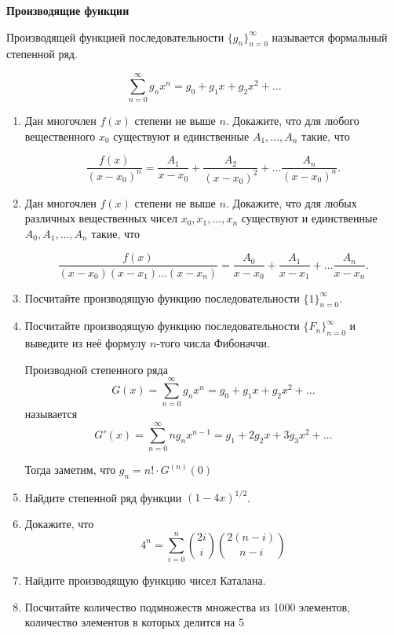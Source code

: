 \documentclass{article}
\begin{document}
\large
	

\begin{center}
\textbf{Производящие функции}
\end{center}


Производящей функцией последовательности $\{g_n\}_{n = 0}^{\infty}$ называется формальный степенной ряд.

$$\sum_{n = 0}^{\infty}g_nx^n = g_0 + g_1x + g_2x^2 + \dotsc$$
\begin{enumerate}[label*=\protect\fbox{\arabic{enumi}}]

\item Дан многочлен $f(x)$ степени не выше $n$. Докажите, что для любого вещественного $x_0$ существуют и единственные $A_1, \dotsc , A_n$ такие, что

$$\frac{f(x)}{(x - x_0)^n} = \frac{A_1}{x-x_0} + \frac{A_2}{(x-x_0)^2} + \dotsc \frac{A_n}{(x-x_0)^n}.$$

\item Дан многочлен $f(x)$ степени не выше $n$. Докажите, что для любых различных вещественных чисел $x_0, x_1, . . . , x_n$ существуют и единственные $A_0, A_1, \dotsc , A_n$ такие, что

$$\frac{f(x)}{(x - x_0)(x-x_1)\dotsc(x-x_n)} = \frac{A_0}{x-x_0} + \frac{A_1}{x-x_1} + \dotsc \frac{A_n}{x-x_n}.$$

\item Посчитайте производящую функцию последовательности $\{1\}_{n = 0}^{\infty}$.

\item Посчитайте производящую функцию последовательности $\{F_n\}_{n = 0}^{\infty}$ и выведите из неё формулу $n$-того числа Фибоначчи.

Производной степенного ряда
$$G(x) = \sum_{n = 0}^{\infty}g_nx^n = g_0 + g_1x + g_2x^2 + \dotsc$$
называется
$$G'(x) = \sum_{n = 0}^{\infty}ng_nx^{n-1} = g_1 + 2g_2x + 3g_3x^2 + \dotsc$$

Тогда заметим, что $g_n = n! \cdot G^{(n)}(0)$

\item Найдите степенной ряд функции $(1 - 4x)^{1/2}$.

\item Докажите, что $$4^n = \sum_{i = 0}^n \binom{2i}{i} \binom{2(n-i)}{n-i}$$

\item Найдите производящую функцию чисел Каталана.

\item Посчитайте количество подмножеств множества из 1000 элементов, количество элементов в которых делится на 5


\end{enumerate}
\end{document}
